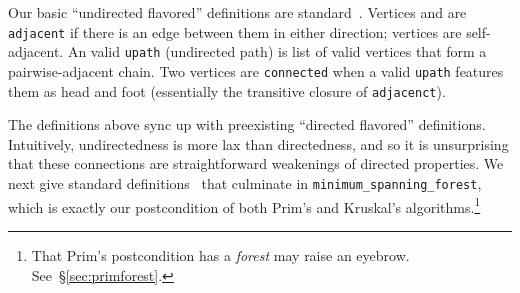 


Our basic ``undirected flavored'' definitions are
standard~\cite{clrs}.
Vertices  and  are \texttt{adjacent} if there is
an edge between them in either direction; vertices are self-adjacent.
An valid \texttt{upath} (undirected path) is list of
valid vertices that form a
pairwise-adjacent chain. Two vertices are \texttt{connected} when a valid \texttt{upath}
features them as head and foot (essentially the transitive
closure of \texttt{adjacenct}).

The definitions above sync up with preexisting ``directed
flavored'' definitions.
Intuitively, undirectedness is more lax than directedness,
and so it is unsurprising that these connections are straightforward
weakenings of directed properties.
We next give standard definitions~\cite{clrs} that culminate in
\texttt{minimum\_spanning\_forest}, which is exactly our postcondition
of both Prim's and Kruskal's algorithms.\footnote{That Prim's postcondition has
a \emph{forest} may raise an eyebrow. See~\S\ref{sec:primforest}.}




